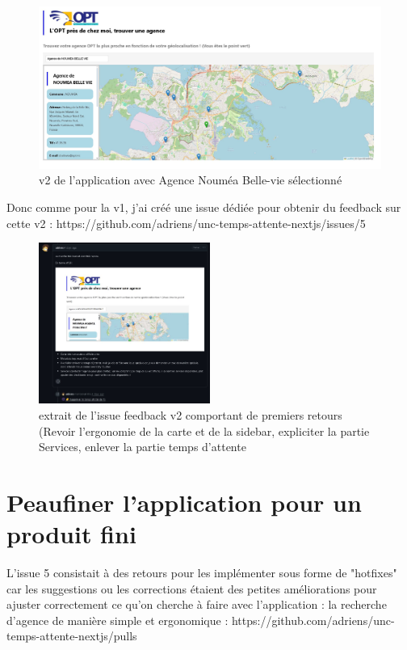 \documentclass[12pt,a4paper]{report}
\begin{document}
\begin{figure}[h] %
    \centering
    \includegraphics[width=1\textwidth]{ressources_rapport/app_opt_v2.JPG}
    \caption{v2 de l'application avec Agence Nouméa Belle-vie sélectionné}
    \label{fig:exemple}
\end{figure}
\vspace{8cm}
Donc comme pour la v1, j'ai créé une issue dédiée pour obtenir du feedback sur cette v2 : https://github.com/adriens/unc-temps-attente-nextjs/issues/5

\begin{figure}[h] %
    \centering
    \includegraphics[width=0.5\textwidth]{ressources_rapport/extrait_issue_5_2.JPG}
    \caption{extrait de l'issue feedback v2 comportant de premiers retours (Revoir l'ergonomie de la carte et de la sidebar, expliciter la partie Services, enlever la partie temps d'attente}
    \label{fig:exemple}
\end{figure}
\newpage

\section{Peaufiner l'application pour un produit fini}
L'issue 5 consistait à des retours pour les implémenter sous forme de "hotfixes" car les suggestions ou les corrections étaient des petites améliorations pour ajuster correctement ce qu'on cherche à faire avec l'application : la recherche d'agence de manière simple et ergonomique : https://github.com/adriens/unc-temps-attente-nextjs/pulls
\end{document}
